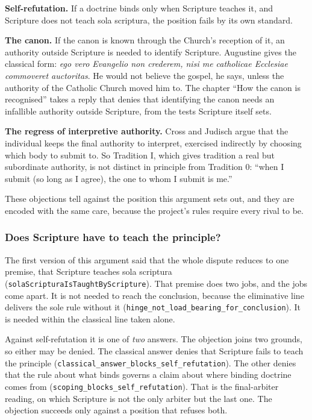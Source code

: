 \documentclass[11pt]{article}
\begin{document}
\textbf{Self-refutation.} If a doctrine binds only when Scripture teaches it, and Scripture does not teach sola scriptura, the position fails by its own standard.

\textbf{The canon.} If the canon is known through the Church’s reception of it, an authority outside Scripture is needed to identify Scripture. Augustine gives the classical form: \emph{ego vero Evangelio non crederem, nisi me catholicae Ecclesiae commoveret auctoritas}. He would not believe the gospel, he says, unless the authority of the Catholic Church moved him to. The chapter “How the canon is recognised” takes a reply that denies that identifying the canon needs an infallible authority outside Scripture, from the tests Scripture itself sets.

\textbf{The regress of interpretive authority.} Cross and Judisch argue that the individual keeps the final authority to interpret, exercised indirectly by choosing which body to submit to. So Tradition I, which gives tradition a real but subordinate authority, is not distinct in principle from Tradition 0: “when I submit (so long as I agree), the one to whom I submit is me.”

These objections tell against the position this argument sets out, and they are encoded with the same care, because the project’s rules require every rival to be.

\subsubsection*{Does Scripture have to teach the principle?}
The first version of this argument said that the whole dispute reduces to one premise, that Scripture teaches sola scriptura (\texttt{sola\allowbreak{}Scriptura\allowbreak{}Is\allowbreak{}Taught\allowbreak{}By\allowbreak{}Scripture}). That premise does two jobs, and the jobs come apart. It is not needed to reach the conclusion, because the eliminative line delivers the sole rule without it (\texttt{hinge\_\allowbreak{}not\_\allowbreak{}load\_\allowbreak{}bearing\_\allowbreak{}for\_\allowbreak{}conclusion}). It is needed within the classical line taken alone.

Against self-refutation it is one of \emph{two} answers. The objection joins two grounds, so either may be denied. The classical answer denies that Scripture fails to teach the principle (\texttt{classical\_\allowbreak{}answer\_\allowbreak{}blocks\_\allowbreak{}self\_\allowbreak{}refutation}). The other denies that the rule about what binds governs a claim about where binding doctrine comes from (\texttt{scoping\_\allowbreak{}blocks\_\allowbreak{}self\_\allowbreak{}refutation}). That is the final-arbiter reading, on which Scripture is not the only arbiter but the last one. The objection succeeds only against a position that refuses both.
\end{document}
